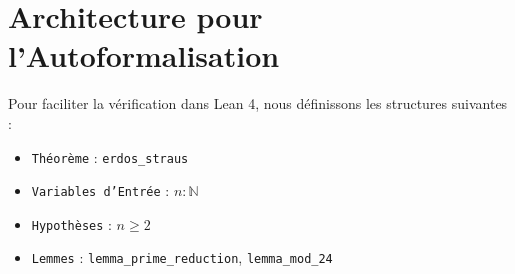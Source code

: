 \documentclass[12pt,a4paper]{article}
\begin{document}
\section{Architecture pour l'Autoformalisation}
Pour faciliter la v\'erification dans Lean 4, nous d\'efinissons les structures suivantes :
\begin{itemize}
    \item \texttt{Th\'eor\`eme} : \texttt{erdos\_straus}
    \item \texttt{Variables d'Entr\'ee} : $n : \mathbb{N}$
    \item \texttt{Hypoth\`eses} : $n \geq 2$
    \item \texttt{Lemmes} : \texttt{lemma\_prime\_reduction}, \texttt{lemma\_mod\_24}
\end{itemize}
\end{document}
